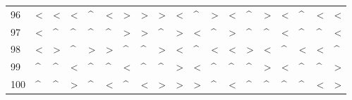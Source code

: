 \begin{tabular}{lllllllllllllllllll}
96  &  < &  < &  < &  \textasciicircum  &  < &  > &  > &  > &  < &  \textasciicircum  &  > &  < &  \textasciicircum  &  > &  < &  \textasciicircum  &  < &  < \\
97  &  < &  \textasciicircum  &  \textasciicircum  &  \textasciicircum  &  \textasciicircum  &  > &  > &  \textasciicircum  &  > &  < &  \textasciicircum  &  > &  \textasciicircum  &  \textasciicircum  &  < &  \textasciicircum  &  \textasciicircum  &  < \\
98  &  < &  > &  \textasciicircum  &  > &  > &  \textasciicircum  &  \textasciicircum  &  > &  < &  \textasciicircum  &  < &  < &  > &  < &  \textasciicircum  &  < &  < &  \textasciicircum  \\
99  &  \textasciicircum  &  \textasciicircum  &  < &  \textasciicircum  &  \textasciicircum  &  < &  \textasciicircum  &  \textasciicircum  &  > &  < &  \textasciicircum  &  \textasciicircum  &  \textasciicircum  &  > &  < &  \textasciicircum  &  \textasciicircum  &  > \\
100 &  \textasciicircum  &  \textasciicircum  &  > &  \textasciicircum  &  < &  \textasciicircum  &  < &  > &  > &  > &  \textasciicircum  &  < &  \textasciicircum  &  \textasciicircum  &  \textasciicircum  &  \textasciicircum  &  < &  > \\
\bottomrule
\end{tabular}
